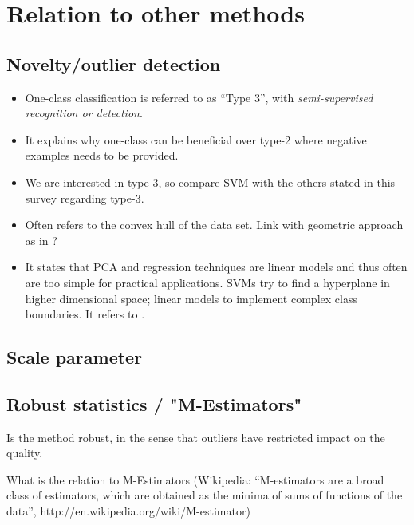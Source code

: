 \section{Relation to other methods}

\subsection{Novelty/outlier detection}
\begin{itemize}
  \item One-class classification is referred to as ``Type 3'', with \emph{semi-supervised recognition or detection}.
  \item It explains why one-class can be beneficial over type-2 where negative examples needs to be provided.
  \item We are interested in type-3, so compare SVM with the others stated in this survey regarding type-3.
  \item Often refers to the convex hull of the data set. Link with geometric approach as in \cite{bennett2000duality,mavroforakis2006geometric}?
  \item It states that PCA and regression techniques are linear models and thus often are too simple for practical applications. SVMs try to find a hyperplane in higher dimensional space; linear models to implement complex class boundaries. It refers to \cite{tax1999support}.
\end{itemize}


\subsection{Scale parameter}
\subsection{Robust statistics / "M-Estimators"}
Is the method robust, in the sense that outliers have restricted impact on the quality.

What is the relation to M-Estimators (Wikipedia: ``M-estimators are a broad class of estimators, which are obtained as the minima of sums of functions of the data'', http://en.wikipedia.org/wiki/M-estimator)


